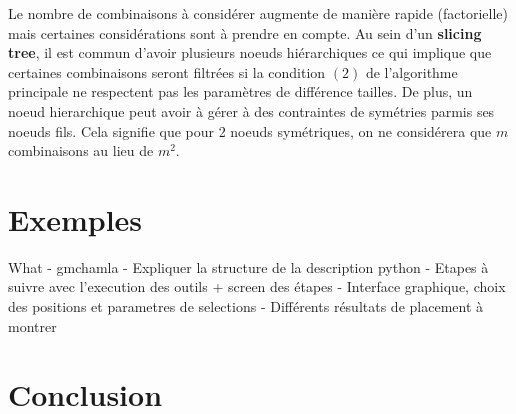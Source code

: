 Le nombre de combinaisons à considérer augmente de manière rapide (factorielle) mais certaines considérations sont à prendre en compte. Au sein d'un \textbf{slicing tree}, il est commun d'avoir plusieurs noeuds hiérarchiques ce qui implique que certaines combinaisons seront filtrées si la condition $(2)$ de l'algorithme principale ne respectent pas les paramètres de différence tailles. De plus, un noeud hierarchique peut avoir à gérer à des contraintes de symétries parmis ses noeuds fils. Cela signifie que pour 2 noeuds symétriques, on ne considérera que $m$ combinaisons au lieu de $m^2$. 





\section{Exemples}
\label{sec:Placement-Exemple}
What
- gmchamla
- Expliquer la structure de la description python
- Etapes à suivre avec l'execution des outils + screen des étapes
- Interface graphique, choix des positions et parametres de selections
- Différents résultats de placement à montrer
\section{Conclusion}